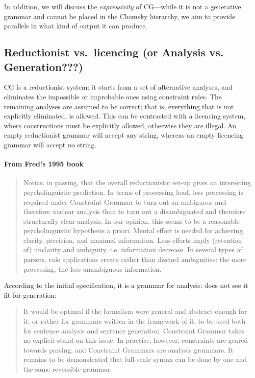 In addition, we will discuss the \emph{expressivity} of CG---while it is not a generative grammar and cannot be placed in the Chomsky hierarchy, we aim to provide parallels in what kind of output it can produce.

\subsection{Reductionist vs.~licencing (or Analysis vs. Generation???)}\label{reductionist-vs.licencing}

CG is a reductionist system: it starts from a set of alternative
analyses, and eliminates the impossible or improbable ones using
constraint rules. The remaining analyses are assumed to be correct; that
is, everything that is not explicitly eliminated, is allowed. This can
be contrasted with a licencing system, where constructions must
be explicitly allowed, otherwise they are illegal. An empty
reductionist grammar will accept any string, whereas an empty
licencing grammar will accept no string.

\paragraph{From Fred's 1995 book}
\begin{quote}
Notice, in passing, that the overall reductionistic set-up gives an
interesting psycholinguistic prediction. In terms of processing load,
less processing is required under Constraint Grammar to turn out an
ambiguous and therefore unclear analysis than to turn out a
disambiguated and therefore structurally clear analysis. In our
opinion, this seems to be a reasonable psycholinguistic hypothesis a priori.
Mental effort is needed for achieving clarity, precision, and maximal
information. Less efforts imply (retention of) unclarity and
ambiguity, i.e. information decrease. In several types of parsers, 
rule applications create rather than discard ambiguities: the more
processing, the less unambiguous information.
\end{quote}

According to the initial specification, it is a grammar for analysis: \cite{karlsson1995constraint} does not see it fit for generation:

\begin{quote}
It would be optimal if the formalism were general and abstract enough for it, or rather for grammars written in the framework of it, to be used both for sentence analysis and sentence generation. 
Constraint Grammar takes no explicit stand on this issue. In practice, however, constraints are geared towards parsing, and Constraint Grammars are analysis grammars. It remains to be demonstrated that full-scale syntax can be done by one and the same reversible grammar.
\end{quote}


